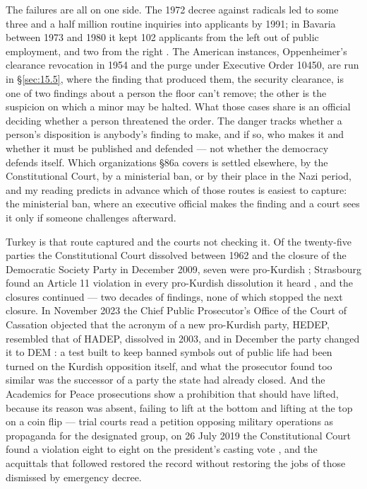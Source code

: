 The failures are all on one side. The 1972 decree against radicals led to some three and a half million routine inquiries into applicants by 1991; in Bavaria between 1973 and 1980 it kept 102 applicants from the left out of public employment, and two from the right \autocite{muehldorfer2014radikalenerlass}. The American instances, Oppenheimer's clearance revocation in 1954 and the purge under Executive Order 10450, are run in \S\ref{sec:15.5}, where the finding that produced them, the security clearance, is one of two findings about a person the floor can't remove; the other is the suspicion on which a minor may be halted. What those cases share is an official deciding whether a person threatened the order. The danger tracks whether a person's disposition is anybody's finding to make, and if so, who makes it and whether it must be published and defended — not whether the democracy defends itself. Which organizations \S86a covers is settled elsewhere, by the Constitutional Court, by a ministerial ban, or by their place in the Nazi period, and my reading predicts in advance which of those routes is easiest to capture: the ministerial ban, where an executive official makes the finding and a court sees it only if someone challenges afterward.

Turkey is that route captured and the courts not checking it. Of the twenty-five parties the Constitutional Court dissolved between 1962 and the closure of the Democratic Society Party in December 2009, seven were pro-Kurdish \autocite{HRW2009DTP,Gungordu2023HDP}; Strasbourg found an Article 11 violation in every pro-Kurdish dissolution it heard \autocite{Article19_2023HDP}, and the closures continued — two decades of findings, none of which stopped the next closure. In November 2023 the Chief Public Prosecutor's Office of the Court of Cassation objected that the acronym of a new pro-Kurdish party, HEDEP, resembled that of HADEP, dissolved in 2003, and in December the party changed it to DEM \autocite{Duvar2023HEDEP}: a test built to keep banned symbols out of public life had been turned on the Kurdish opposition itself, and what the prosecutor found too similar was the successor of a party the state had already closed. And the Academics for Peace prosecutions show a prohibition that should have lifted, because its reason was absent, failing to lift at the bottom and lifting at the top on a coin flip — trial courts read a petition opposing military operations as propaganda for the designated group, on 26 July 2019 the Constitutional Court found a violation eight to eight on the president's casting vote \autocite{AYM2019Ustel,Bianet2019AcademicsForPeace}, and the acquittals that followed restored the record without restoring the jobs of those dismissed by emergency decree.

